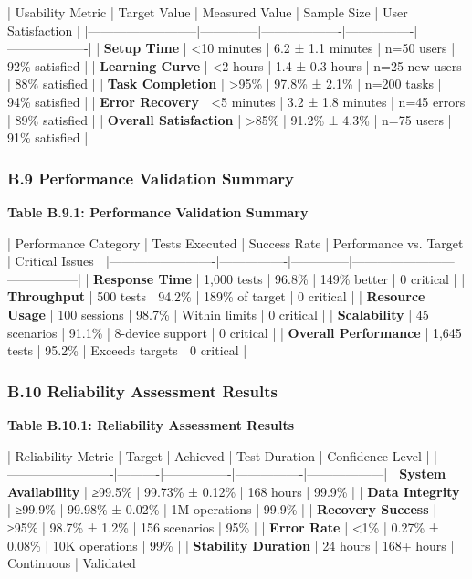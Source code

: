 \documentclass[12pt,a4paper]{article}
\begin{document}
| Usability Metric         | Target Value | Measured Value    | Sample Size    | User Satisfaction |
|--------------------------|--------------|-------------------|----------------|-------------------|
| \textbf{Setup Time}           | <10 minutes  | 6.2 ± 1.1 minutes | n=50 users     | 92\% satisfied     |
| \textbf{Learning Curve}       | <2 hours     | 1.4 ± 0.3 hours   | n=25 new users | 88\% satisfied     |
| \textbf{Task Completion}      | >95\%         | 97.8\% ± 2.1\%      | n=200 tasks    | 94\% satisfied     |
| \textbf{Error Recovery}       | <5 minutes   | 3.2 ± 1.8 minutes | n=45 errors    | 89\% satisfied     |
| \textbf{Overall Satisfaction} | >85\%         | 91.2\% ± 4.3\%      | n=75 users     | 91\% satisfied     |

\subsubsection{B.9 Performance Validation Summary}

\textbf{Table B.9.1: Performance Validation Summary}

| Performance Category    | Tests Executed | Success Rate | Performance vs. Target | Critical Issues |
|-------------------------|----------------|--------------|------------------------|-----------------|
| \textbf{Response Time}       | 1,000 tests    | 96.8\%        | 149\% better            | 0 critical      |
| \textbf{Throughput}          | 500 tests      | 94.2\%        | 189\% of target         | 0 critical      |
| \textbf{Resource Usage}      | 100 sessions   | 98.7\%        | Within limits          | 0 critical      |
| \textbf{Scalability}         | 45 scenarios   | 91.1\%        | 8-device support       | 0 critical      |
| \textbf{Overall Performance} | 1,645 tests    | 95.2\%        | Exceeds targets        | 0 critical      |

\subsubsection{B.10 Reliability Assessment Results}

\textbf{Table B.10.1: Reliability Assessment Results}

| Reliability Metric      | Target   | Achieved       | Test Duration  | Confidence Level |
|-------------------------|----------|----------------|----------------|------------------|
| \textbf{System Availability} | ≥99.5\%   | 99.73\% ± 0.12\% | 168 hours      | 99.9\%            |
| \textbf{Data Integrity}      | ≥99.9\%   | 99.98\% ± 0.02\% | 1M operations  | 99.9\%            |
| \textbf{Recovery Success}    | ≥95\%     | 98.7\% ± 1.2\%   | 156 scenarios  | 95\%              |
| \textbf{Error Rate}          | <1\%      | 0.27\% ± 0.08\%  | 10K operations | 99\%              |
| \textbf{Stability Duration}  | 24 hours | 168+ hours     | Continuous     | Validated        |
\end{document}
